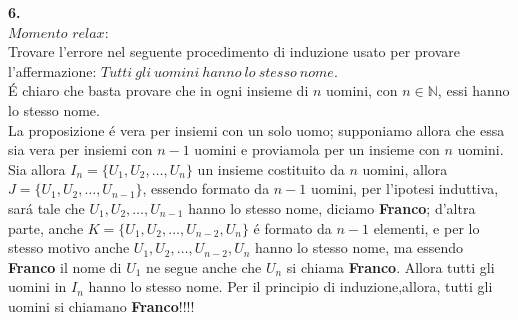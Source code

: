 \documentclass[italian,a4paper,11pt]
{article}
\newcommand{\N}{\mathbb{N}}
\begin{document}
\vspace{0.4cm}
\noindent
\begin{Ex}\textbf{ 6.}\\
$Momento$ $relax$:\\
Trovare l'errore nel seguente procedimento di induzione usato per provare l'affermazione: $\mathit{Tutti\ gli\ uomini\ hanno\ lo\ stesso\ nome}$.\\
\'E chiaro che basta provare che in ogni insieme di $n$ uomini, con $n\in \N$, essi hanno lo stesso nome.\\
La proposizione \'e vera per insiemi con un solo uomo; supponiamo allora che essa sia vera per insiemi con $n-1$ uomini e proviamola per un insieme con $n$ uomini. Sia allora $I_n=\{U_1,U_2,\dots,U_n\}$ un insieme costituito da $n$ uomini, allora $J=\{U_1,U_2,\dots,U_{n-1}\}$, essendo formato da $n-1$ uomini, per l'ipotesi induttiva, sar\'a tale che $U_1,U_2,\dots,U_{n-1}$ hanno lo stesso nome, diciamo \textbf{Franco}; d'altra parte, anche $K=\{U_1,U_2,\dots,U_{n-2}, U_n\}$ \'e formato da $n-1$ elementi, e per lo stesso motivo anche $U_1,U_2,\dots,U_{n-2}, U_n$ hanno lo stesso nome, ma essendo \textbf{Franco} il nome di $U_1$ ne segue anche che $U_n$ si chiama \textbf{Franco}. Allora tutti gli uomini in $I_n$ hanno lo stesso nome. Per il principio di induzione,allora, tutti gli uomini si chiamano \textbf{Franco}!!!!
\end{Ex}
\end{document}
